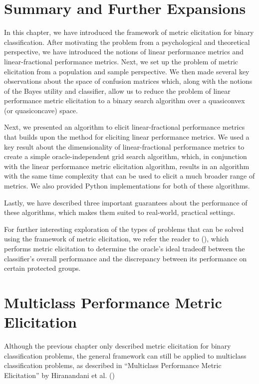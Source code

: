 \documentclass[
  letterpaper,
  numbers=noenddot,
  DIV=11,
  oneside]{scrreprt}
\theoremstyle{remark}
\begin{document}
\section{Summary and Further
Expansions}\label{summary-and-further-expansions}

In this chapter, we have introduced the framework of metric elicitation
for binary classification. After motivating the problem from a
psychological and theoretical perspective, we have introduced the
notions of linear performance metrics and linear-fractional performance
metrics. Next, we set up the problem of metric elicitation from a
population and sample perspective. We then made several key observations
about the space of confusion matrices which, along with the notions of
the Bayes utility and classifier, allow us to reduce the problem of
linear performance metric elicitation to a binary search algorithm over
a quasiconvex (or quasiconcave) space.

Next, we presented an algorithm to elicit linear-fractional performance
metrics that builds upon the method for eliciting linear performance
metrics. We used a key result about the dimensionality of
linear-fractional performance metrics to create a simple
oracle-independent grid search algorithm, which, in conjunction with the
linear performance metric elicitation algorithm, results in an algorithm
with the same time complexity that can be used to elicit a much broader
range of metrics. We also provided Python implementations for both of
these algorithms.

Lastly, we have described three important guarantees about the
performance of these algorithms, which makes them suited to real-world,
practical settings.

For further interesting exploration of the types of problems that can be
solved using the framework of metric elicitation, we refer the reader to
(), which
performs metric elicitation to determine the oracle's ideal tradeoff
between the classifier's overall performance and the discrepancy between
its performance on certain protected groups.

\section{Multiclass Performance Metric
Elicitation}\label{multiclass-performance-metric-elicitation}

Although the previous chapter only described metric elicitation for
binary classification problems, the general framework can still be
applied to multiclass classification problems, as described in
``Multiclass Performance Metric Elicitation'' by Hiranandani et al.
()
\end{document}
